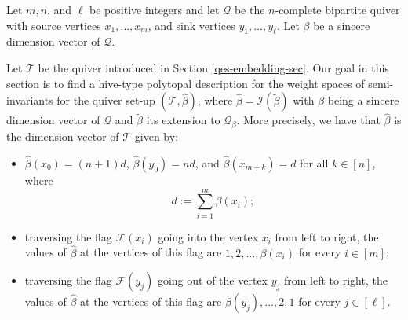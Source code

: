 \documentclass[11pt]{article}
\theoremstyle{definition}
\numberwithin{equation}{section}
\newcommand{\Q}{\mathbf{\mathcal{Q}}}
\newcommand{\I}{\mathcal I }
\newcommand{\F}{\mathcal{F}}
\newcommand{\river}{\mathcal{T}}
\begin{document}
Let $m,n$, and $\ell$ be positive integers and let $\Q$ be the $n$-complete bipartite quiver with source vertices $x_1, \ldots, x_m$, and sink vertices $y_1, \ldots, y_{\ell}$. Let $\beta$ be a sincere dimension vector of $\Q$.

Let $\river$ be the quiver introduced in Section \ref{qes-embedding-sec}. Our goal in this section is to find a hive-type polytopal description for the weight spaces of semi-invariants for the quiver set-up $(\river, \widehat{\beta})$, where $\widehat{\beta}=\I(\widetilde{\beta})$ with $\beta$ being a sincere dimension vector of $\Q$ and $\widetilde{\beta}$  its extension to $\Q_{\beta}$. More precisely, we have that $\widehat{\beta}$ is the dimension vector of $\river$ given by:
\begin{itemize}
\item $\widehat{\beta}(x_0)=(n+1)d$, $\widehat{\beta}(y_0)=nd$, and $\widehat{\beta}(x_{m+k})=d$ for all $k \in [n]$, where 
$$
d:=\sum_{i=1}^m \beta(x_i);
$$

\item traversing the flag $\F(x_i)$ going into the vertex $x_i$ from left to right, the values of $\widehat{\beta}$ at the vertices of this flag  are $1, 2, \ldots, \beta(x_i)$ for every $i \in [m]$;\\

 \item traversing the flag $\F(y_j)$ going out of the vertex $y_j$ from left to right, the values of $\widehat{\beta}$ at the vertices of this flag  are $\beta(y_j), \ldots, 2, 1$ for every $j \in [\ell]$.
\end{itemize} 
\end{document}
